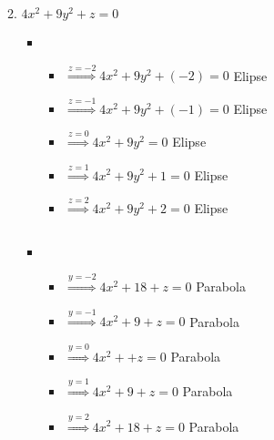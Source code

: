 \documentclass[../practica_02.tex]{subfiles}
\begin{document}
\begin{enumerate}
\begin{enumerate}
\begin{itemize}
                            $ $
                    \end{itemize}

                \item $4x^2 + 9y^2 + z = 0$

                    \begin{itemize}
                        \item
                            \begin{itemize}
                                \item $\stackrel{z=-2}{\Rightarrow} 4x^2 + 9y^2 +(-2) = 0 $ Elipse
                                \item $\stackrel{z=-1}{\Rightarrow} 4x^2 + 9y^2 +(-1) = 0 $ Elipse
                                \item $\stackrel{z=0}{\Rightarrow}  4x^2 + 9y^2       = 0 $ Elipse
                                \item $\stackrel{z=1}{\Rightarrow}  4x^2 + 9y^2 + 1   = 0 $ Elipse
                                \item $\stackrel{z=2}{\Rightarrow}  4x^2 + 9y^2 + 2   = 0 $ Elipse
                            \end{itemize}

                        $ $

                        \item
                            \begin{itemize}
                                \item $\stackrel{y=-2}{\Rightarrow} 4x^2 + 18 + z = 0 $ Parabola
                                \item $\stackrel{y=-1}{\Rightarrow} 4x^2 + 9  + z = 0 $ Parabola
                                \item $\stackrel{y=0}{\Rightarrow}  4x^2 +    + z = 0 $ Parabola
                                \item $\stackrel{y=1}{\Rightarrow}  4x^2 + 9  + z = 0 $ Parabola
                                \item $\stackrel{y=2}{\Rightarrow}  4x^2 + 18 + z = 0 $ Parabola
                            \end{itemize}

                            $ $


\end{itemize}
\end{enumerate}
\end{enumerate}
\end{document}

